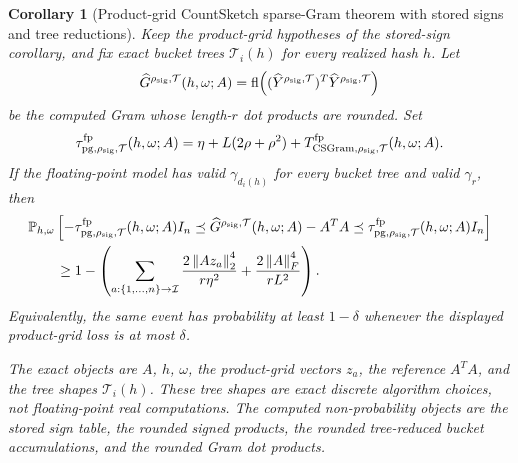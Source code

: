 \documentclass[11pt]{article}
\newcommand{\Prob}{\mathbb{P}}
\newcommand{\Frob}[1]{\left\lVert #1\right\rVert_F}
\newcommand{\Norm}[1]{\left\lVert #1\right\rVert_2}
\newcommand{\fl}{\operatorname{fl}}
\newcommand{\I}{I}
\newtheorem{corollary}[theorem]{Corollary}
\theoremstyle{remark}
\begin{document}
\begin{corollary}[Product-grid CountSketch sparse-Gram theorem with stored signs and tree reductions]
Keep the product-grid hypotheses of the stored-sign corollary, and fix exact
bucket trees \(\mathcal T_i(h)\) for every realized hash \(h\).  Let
\[
  \widehat G^{\rho_{\rm sig},\mathcal T}(h,\omega;A)
  =
  \fl\!\left(
    (\widehat Y^{\rho_{\rm sig},\mathcal T})^T
    \widehat Y^{\rho_{\rm sig},\mathcal T}
  \right)
\]
be the computed Gram whose length-\(r\) dot products are rounded.  Set
\[
  \tau_{{\rm pg},\rho_{\rm sig},\mathcal T}^{\rm fp}(h,\omega;A)
  =
  \eta+L(2\rho+\rho^2)
  +
  T_{{\rm CSGram},\rho_{\rm sig},\mathcal T}^{\rm fp}(h,\omega;A).
\]
If the floating-point model has valid \(\gamma_{d_i(h)}\) for every bucket
tree and valid \(\gamma_r\), then
\[
\begin{aligned}
&\Prob_{h,\omega}
  \left[
    -\tau_{{\rm pg},\rho_{\rm sig},\mathcal T}^{\rm fp}(h,\omega;A)\I_n
    \preceq
    \widehat G^{\rho_{\rm sig},\mathcal T}(h,\omega;A)-A^TA
    \preceq
    \tau_{{\rm pg},\rho_{\rm sig},\mathcal T}^{\rm fp}(h,\omega;A)\I_n
  \right]
\\
&\qquad\ge
  1-
  \left(
    \sum_{a:\{1,\ldots,n\}\to\mathcal I}
      \frac{2\Norm{Az_a}^4}{r\eta^2}
    +
      \frac{2\Frob{A}^4}{rL^2}
  \right).
\end{aligned}
\]
Equivalently, the same event has probability at least \(1-\delta\) whenever
the displayed product-grid loss is at most \(\delta\).

The exact objects are \(A\), \(h\), \(\omega\), the product-grid vectors
\(z_a\), the reference \(A^TA\), and the tree shapes
\(\mathcal T_i(h)\).  These tree shapes are exact discrete algorithm choices,
not floating-point real computations.  The computed non-probability objects
are the stored sign table, the rounded signed products, the rounded
tree-reduced bucket accumulations, and the rounded Gram dot products.


\end{corollary}
\end{document}

